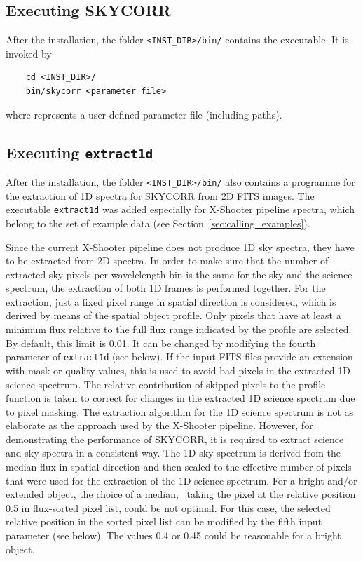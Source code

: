 \subsection{Executing SKYCORR}\label{sec:calling}
After the installation, the folder {\tt <INST\_DIR>/bin/} contains the
executable. It is invoked by
\begin{verbatim}
    cd <INST_DIR>/
    bin/skycorr <parameter file>
\end{verbatim}
where {\tt <parameter file>} represents a user-defined parameter file
(including paths).

\subsection{Executing {\tt extract1d}}\label{sec:extract1d}
After the installation, the folder {\tt <INST\_DIR>/bin/} also contains
a programme for the extraction of 1D spectra for SKYCORR from 2D \ac{FITS}
images. The executable {\tt extract1d} was added especially for X-Shooter
pipeline spectra, which belong to the set of example data (see
Section~\ref{sec:calling_examples}).

Since the current X-Shooter pipeline does not produce 1D sky spectra, they have
to be extracted from 2D spectra. In order to make sure that the number of
extracted sky pixels per wavelelength bin is the same for the sky and the
science spectrum, the extraction of both 1D frames is performed together. For
the extraction, just a fixed pixel range in spatial direction is considered,
which is derived by means of the spatial object profile. Only pixels that have
at least a minimum flux relative to the full flux range indicated by the
profile are selected. By default, this limit is 0.01. It can be changed by
modifying the fourth parameter of {\tt extract1d} (see below). If the input
\ac{FITS} files provide an extension with mask or quality values, this is used
to avoid bad pixels in the extracted 1D science spectrum. The relative
contribution of skipped pixels to the profile function is taken to correct for
changes in the extracted 1D science spectrum due to pixel masking. The
extraction algorithm for the 1D science spectrum is not as elaborate as the
approach used by the X-Shooter pipeline. However, for demonstrating the
performance of SKYCORR, it is required to extract science and sky spectra in a
consistent way. The 1D sky spectrum is derived from the median flux in spatial
direction and then scaled to the effective number of pixels that were used for
the extraction of the 1D science spectrum. For a bright and/or extended object,
the choice of a median, \ie\ taking the pixel at the relative position 0.5 in
flux-sorted pixel list, could be not optimal. For this case, the selected
relative position in the sorted pixel list can be modified by the fifth input
parameter (see below). The values 0.4 or 0.45 could be reasonable for a bright
object.

